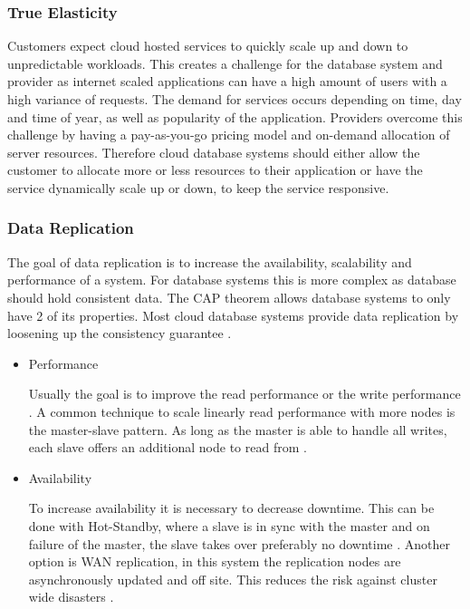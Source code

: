 \subsubsection{True Elasticity}
Customers expect cloud hosted services to quickly scale up and down to unpredictable workloads. This creates a challenge for the database system and provider as internet scaled applications can have a high amount of users with a high variance of requests. The demand for services occurs depending on time, day and time of year, as well as popularity of the application. Providers overcome this challenge by having a pay-as-you-go pricing model and on-demand allocation of server resources. Therefore cloud database systems should either allow the customer to allocate more or less resources to their application or have the service dynamically scale up or down, to keep the service responsive.

\subsubsection{Data Replication}
The goal of data replication is to increase the availability, scalability and performance of a system. For database systems this is more complex as database should hold consistent data. The CAP theorem allows database systems to only have 2 of its properties. Most cloud database systems provide data replication by loosening up the consistency guarantee \cite{sakr2014cloud}.
\begin{itemize}
    \item Performance
    
    Usually the goal is to improve the read performance or the write performance \cite{cecchet2008middleware}.  A common technique to scale linearly read performance with more nodes is the master-slave pattern. As long as the master is able to handle all writes, each slave offers an additional node to read from \cite{cecchet2008middleware}.
    
    \item Availability
    
    To increase availability it is necessary to decrease downtime. This can be done with Hot-Standby, where a slave is in sync with the master and on failure of the master, the slave takes over preferably no downtime \cite{cecchet2008middleware}. Another option is WAN replication, in this system the replication nodes are asynchronously updated and off site. This reduces the risk against cluster wide disasters \cite{cecchet2008middleware}. 
\end{itemize}


